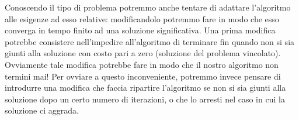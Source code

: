 		Conoscendo il tipo di problema potremmo anche tentare di adattare l'algoritmo alle esigenze ad esso relative: modificandolo potremmo fare in modo che esso converga in tempo finito ad una soluzione significativa. Una prima modifica potrebbe consistere nell'impedire all'algoritmo di terminare fin quando non si sia giunti alla soluzione con costo pari a zero (soluzione del problema vincolato). Ovviamente tale modifica potrebbe fare in modo che il nostro algoritmo non termini mai! Per ovviare a questo inconveniente, potremmo invece pensare di introdurre una modifica che faccia ripartire l'algoritmo se non si sia giunti alla soluzione dopo un certo numero di iterazioni, o che lo arresti nel caso in cui la soluzione ci aggrada.
		
